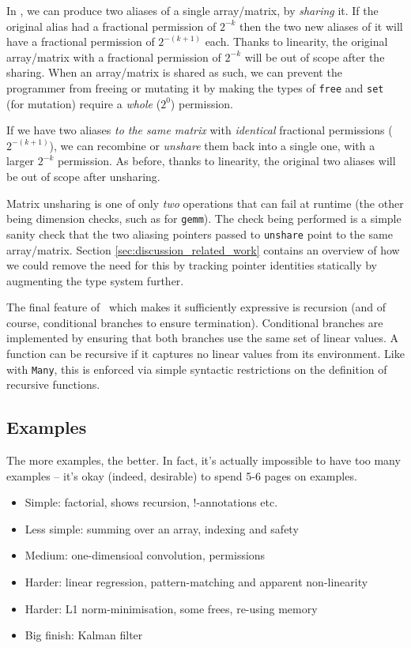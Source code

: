 In \lang, we can produce two aliases of a single array/matrix, by
\emph{sharing} it. If the original alias had a fractional permission of
$2^{-k}$ then the two new aliases of it will have a fractional permission of
$2^{-(k+1)}$ each. Thanks to linearity, the original array/matrix with a
fractional permission of $2^{-k}$ will be out of scope after the sharing.  When
an array/matrix is shared as such, we can prevent the programmer from freeing
or mutating it by making the types of \texttt{free} and \texttt{set} (for
mutation) require a \emph{whole} ($2^0$) permission.

If we have two aliases \emph{to the same matrix} with \emph{identical}
fractional permissions ($2^{-(k+1)}$), we can recombine or \emph{unshare} them
back into a single one, with a larger $2^{-k}$ permission. As before, thanks to
linearity, the original two aliases will be out of scope after unsharing.

Matrix unsharing is one of only \emph{two} operations that can fail at runtime
(the other being dimension checks, such as for \texttt{gemm}). The check being
performed is a simple sanity check that the two aliasing pointers passed to
\texttt{unshare} point to the same array/matrix. Section
\ref{sec:discussion_related_work} contains an overview of how we could remove
the need for this by tracking pointer identities statically by augmenting the
type system further.

The final feature of \lang\ which makes it sufficiently expressive is recursion
(and of course, conditional branches to ensure termination). Conditional
branches are implemented by ensuring that both branches use the same set of
linear values. A function can be recursive if it captures no linear values from
its environment. Like with \texttt{Many}, this is enforced via simple syntactic
restrictions on the definition of recursive functions.

\subsection{Examples}

The more examples, the better. In fact, it's actually impossible to
have too many examples -- it's okay (indeed, desirable) to spend 5-6
pages on examples.

\begin{itemize}

    \item Simple: factorial, shows recursion, !-annotations etc.

    \item Less simple: summing over an array, indexing and safety

    \item Medium: one-dimensioal convolution, permissions

    \item Harder: linear regression, pattern-matching and apparent non-linearity

    \item Harder: L1 norm-minimisation, some frees, re-using memory

    \item Big finish: Kalman filter

\end{itemize}
